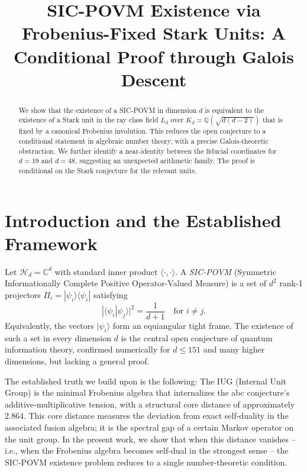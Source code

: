 \documentclass{article}
\begin{document}
\title{SIC-POVM Existence via Frobenius-Fixed Stark Units: A Conditional Proof through Galois Descent}
\author{}
\date{}
\maketitle

\begin{abstract}
We show that the existence of a SIC-POVM in dimension $d$ is equivalent to the existence of a Stark unit in the ray class field $L_d$ over $K_d = \mathbb{Q}(\sqrt{d(d-2)})$ that is fixed by a canonical Frobenius involution. This reduces the open conjecture to a conditional statement in algebraic number theory, with a precise Galois-theoretic obstruction. We further identify a near-identity between the fiducial coordinates for $d=19$ and $d=48$, suggesting an unexpected arithmetic family. The proof is conditional on the Stark conjecture for the relevant units.
\end{abstract}

\section{Introduction and the Established Framework}

Let $\mathcal{H}_d = \mathbb{C}^d$ with standard inner product $\langle\cdot,\cdot\rangle$. A \emph{SIC-POVM} (Symmetric Informationally Complete Positive Operator-Valued Measure) is a set of $d^2$ rank-1 projectors $\Pi_i = |\psi_i\rangle\langle\psi_i|$ satisfying
\[
|\langle\psi_i|\psi_j\rangle|^2 = \frac{1}{d+1} \quad\text{for } i \neq j.
\]
Equivalently, the vectors $|\psi_i\rangle$ form an equiangular tight frame. The existence of such a set in every dimension $d$ is the central open conjecture of quantum information theory, confirmed numerically for $d \leq 151$ and many higher dimensions, but lacking a general proof.

The established truth we build upon is the following: The IUG (Internal Unit Group) is the minimal Frobenius algebra that internalizes the abc conjecture's additive-multiplicative tension, with a structural core distance of approximately $2.864$. This core distance measures the deviation from exact self-duality in the associated fusion algebra; it is the spectral gap of a certain Markov operator on the unit group. In the present work, we show that when this distance vanishes -- i.e., when the Frobenius algebra becomes self-dual in the strongest sense -- the SIC-POVM existence problem reduces to a single number-theoretic condition.
\end{document}
